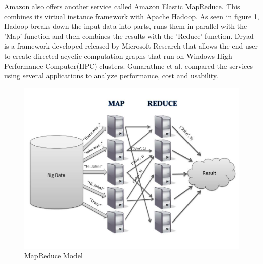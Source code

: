 \documentclass[12pt]{article}
\begin{document}
Amazon also offers another service called Amazon Elastic MapReduce. This
combines its virtual instance framework with Apache Hadoop. As seen
in figure \ref{fig:map}, Hadoop breaks down the input data into parts, runs them in parallel
with the 'Map' function and then combines the results with the 'Reduce'
function. Dryad is a framework developed released by Microsoft Research that
allows the end-user to create directed acyclic computation graphs that run on
Windows High Performance Computer(HPC) clusters. Gunarathne et al. compared
the services using several applications to analyze performance, cost and
usability.

\begin{figure}
    \begin{center}
        \includegraphics{figures/MapReduce.jpg}
    \end{center}
    \caption{MapReduce Model}
    \label{fig:map}
\end{figure}
\end{document}
